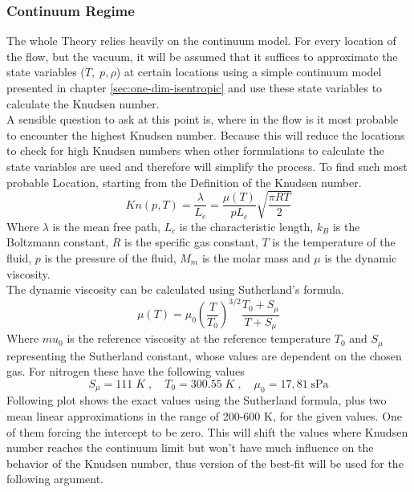 \subsubsection*{Continuum Regime}
	The whole Theory relies heavily on the continuum model.
	For every location of the flow, but the vacuum, it will be assumed that it suffices to approximate the state variables ($T,\; p, \rho$) at certain locations using a simple continuum model presented in chapter \ref{sec:one-dim-isentropic} and use these state variables to calculate the Knudsen number.\\
	A sensible question to ask at this point is, where in the flow is it most probable to encounter the highest Knudsen number.
	Because this will reduce the locations to check for high Knudsen numbers when other formulations to calculate the state variables are used and therefore will simplify the process.
	To find such most probable Location, starting from the Definition of the Knudsen number.
	\cite{halwidl_development_2016, anderson2021modern}
	\begin{equation}
		Kn(p,T) = \frac{\lambda}{L_c} = \frac{\mu(T)}{pL_c}\sqrt{\frac{\pi R T}{2}}
	\end{equation}
	Where $\lambda$ is the mean free path, $L_c$ is the characteristic length, $k_B$ is the Boltzmann constant, $R$ is the specific gas constant, $T$ is the temperature of the fluid, $p$ is the pressure of the fluid, $M_m$ is the molar mass and $\mu$ is the dynamic viscosity.\\
	The dynamic viscosity can be calculated using Sutherland's formula. \cite{Hirschfelder1954MolecularTO}
	\begin{equation}
		\mu(T) = \mu_0 \left(\frac{T}{T_0}\right)^{3/2} \frac{T_0 + S_\mu}{T + S_\mu}
	\end{equation}
	Where $mu_0$ is the reference viscosity at the reference temperature $T_0$ and $S_\mu$ representing the Sutherland constant, whose values are dependent on the chosen gas. For nitrogen these have the following values \cite{kim2004numericalanalysisflowcharacteristics}
	$$
		S_\mu = 111\;K\;,\quad T_0 = 300.55\;K\;,\quad\mu_0 = 17,81\; \text{sPa} 
	$$
	Following plot shows the exact values using the Sutherland formula, plus two mean linear approximations in the range of 200-600 K, for the given values.
	One of them forcing the intercept to be zero.
	This will shift the values where Knudsen number reaches the continuum limit but won't have much influence on the behavior of the Knudsen number, thus version of the best-fit will be used for the following argument.
